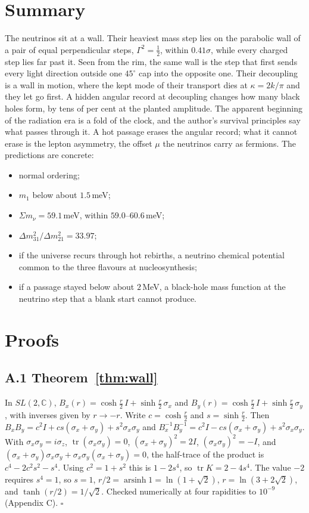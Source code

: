 \documentclass[11pt]{article}
\theoremstyle{definition}\newtheorem{hypothesis}{Hypothesis}\newtheorem{prediction}{Prediction}
\theoremstyle{remark}\newtheorem{remark}[theorem]{Remark}
\begin{document}
\section{Summary}
The neutrinos sit at a wall. Their heaviest mass step lies on the parabolic wall of a pair of equal perpendicular steps, $\Gamma^2=\tfrac12$, within $0.41\sigma$, while every charged step lies far past it. Seen from the rim, the same wall is the step that first sends every light direction outside one $45^\circ$ cap into the opposite one. Their decoupling is a wall in motion, where the kept mode of their transport dies at $\kappa=2k/\pi$ and they let go first. A hidden angular record at decoupling changes how many black holes form, by tens of per cent at the planted amplitude. The apparent beginning of the radiation era is a fold of the clock, and the author's survival principles say what passes through it. A hot passage erases the angular record; what it cannot erase is the lepton asymmetry, the offset $\mu$ the neutrinos carry as fermions. The predictions are concrete:
\begin{itemize}[nosep]
\item normal ordering;
\item $m_1$ below about $1.5$\,meV;
\item $\Sigma m_\nu=59.1$\,meV, within $59.0$--$60.6$\,meV;
\item $\Delta m^2_{31}/\Delta m^2_{21}=33.97$;
\item if the universe recurs through hot rebirths, a neutrino chemical potential common to the three flavours at nucleosynthesis;
\item if a passage stayed below about $2$\,MeV, a black-hole mass function at the neutrino step that a blank start cannot produce.
\end{itemize}

\appendix
\section{Proofs}
\subsection*{A.1 Theorem~\ref{thm:wall}}
In $SL(2,\mathbb C)$, $B_x(r)=\cosh\tfrac r2\,I+\sinh\tfrac r2\,\sigma_x$ and $B_y(r)=\cosh\tfrac r2\,I+\sinh\tfrac r2\,\sigma_y$, with inverses given by $r\to-r$. Write $c=\cosh\tfrac r2$ and $s=\sinh\tfrac r2$. Then $B_xB_y=c^2I+cs(\sigma_x+\sigma_y)+s^2\sigma_x\sigma_y$ and $B_x^{-1}B_y^{-1}=c^2I-cs(\sigma_x+\sigma_y)+s^2\sigma_x\sigma_y$. With $\sigma_x\sigma_y=i\sigma_z$, $\operatorname{tr}(\sigma_x\sigma_y)=0$, $(\sigma_x+\sigma_y)^2=2I$, $(\sigma_x\sigma_y)^2=-I$, and $(\sigma_x+\sigma_y)\sigma_x\sigma_y+\sigma_x\sigma_y(\sigma_x+\sigma_y)=0$, the half-trace of the product is $c^4-2c^2s^2-s^4$. Using $c^2=1+s^2$ this is $1-2s^4$, so $\operatorname{tr}K=2-4s^4$. The value $-2$ requires $s^4=1$, so $s=1$, $r/2=\operatorname{arsinh}1=\ln(1+\sqrt2)$, $r=\ln(3+2\sqrt2)$, and $\tanh(r/2)=1/\sqrt2$. Checked numerically at four rapidities to $10^{-9}$ (Appendix C). $\square$
\end{document}
